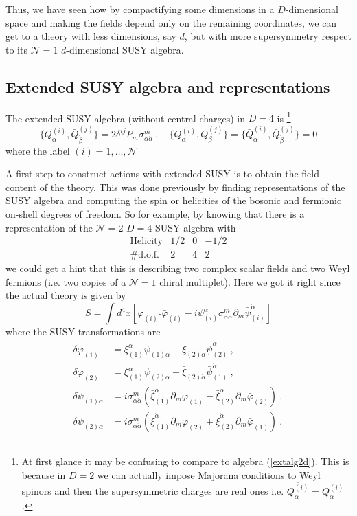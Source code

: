 \documentclass[a4paper,12pt]{article}
\numberwithin{equation}{section}
\numberwithin{exe}{section}
\newcommand{\p}{{\partial}}
\newcommand{\Qb}{{\bar Q}}
\renewcommand{\a}{{\alpha}}
\newcommand{\ad}{{\dot\alpha}}
\renewcommand{\b}{{\beta}}
\newcommand{\bd}{{\dot\beta}}
\renewcommand{\d}{{\delta}}
\newcommand{\s}{{\sigma}}
\newcommand{\vphi}{{\varphi}}
\newcommand{\vphib}{{\bar\varphi}}
\newcommand{\xib}{{\bar\xi}}
\newcommand{\psib}{{\bar\psi}}
\begin{document}
Thus, we have seen how by compactifying some dimensions in a $D$-dimensional space and making the fields depend only on the remaining coordinates, we can get to a theory with less dimensions, say $d$, but with more supersymmetry respect to its $\mathcal N=1$ $d$-dimensional SUSY algebra.


\subsection{Extended SUSY algebra and representations}

The extended SUSY algebra (without central charges) in $D=4$ is%
\footnote{At first glance it may be confusing to compare to algebra (\ref{extalg2d}). This is because in $D=2$ we can actually impose Majorana conditions to Weyl spinors and then the supersymmetric charges are real ones i.e. $\overline{Q^{(i)}_\a} = Q^{(i)}_\a$.}
	\begin{equation}
	\{Q_\a^{(i)}, \Qb_\bd^{(j)}\} = 2\d^{ij} P_m \s^m_{\a\ad}\ ,\quad \{Q_\a^{(i)}, Q_\b^{(j)}\} = \{\Qb_\ad^{(i)}, \Qb_\bd^{(j)}\} = 0
	\end{equation}
where the label $(i)=1,\ldots,\mathcal N$

A first step to construct actions with extended SUSY is to obtain the field content of the theory. This was done previously by finding representations of the SUSY algebra and computing the spin or helicities of the bosonic and fermionic on-shell degrees of freedom. So for example, by knowing that there is a representation of the $\mathcal N=2$ $D=4$ SUSY algebra with
	\begin{equation}
		\begin{array}{cccc}
		\text{Helicity} & 1/2 & 0 & -1/2 \\
		\#\text{d.o.f.} & 2 & 4 & 2
		\end{array}
	\end{equation}
we could get a hint that this is describing two complex scalar fields and two Weyl fermions (i.e. two copies of a $\mathcal N=1$ chiral multiplet). Here we got it right since the actual theory is given by
	\begin{equation}
	S = \int d^4x [\vphi_{(i)} \square \vphib_{(i)} - i\psi^\a_{(i)} \s^m_{\a\ad} \p_m \psib^\ad_{(i)} ]
	\end{equation}
where the SUSY transformations are
	\begin{equation}
		\begin{aligned}
		\d \vphi_{(1)} & = \xi^\a_{(1)} \psi_{(1)\a} + \xib_{(2)\ad} \psib^\ad_{(2)}\ , \\
		\d \vphi_{(2)} & = \xi^\a_{(1)} \psi_{(2)\a} - \xib_{(2)\ad} \psib^\ad_{(1)}\ , \\
		\d \psi_{(1)\a} & = i\s^m_{\a\ad} (\xib^\ad_{(1)} \p_m \vphi_{(1)} - \xib^\ad_{(2)} \p_m \vphib_{(2)})\ , \\
		\d \psi_{(2)\a} & = i \s^m_{\a\ad} (\xib^\ad_{(1)} \p_m \vphi_{(2)} + \xib^\ad_{(2)} \p_m \vphib_{(1)})\ .
		\end{aligned}
	\end{equation}
\end{document}

